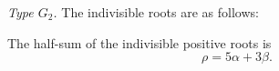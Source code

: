 \medskip
\noindent\emph{Type \(G_2\).}
The indivisible roots are as follows:
\begin{center}
\end{center}
The half-sum of the indivisible positive roots is
\[
 \rho=5\alpha+3\beta.
\]
